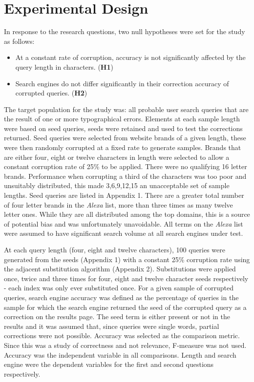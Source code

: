 \documentclass{csfourzero}
\begin{document}
\section{Experimental Design}
\label{sec:exp}

In response to the research questions, two null hypotheses were set for the study as follows:
\begin{itemize}
  \item{At a constant rate of corruption, accuracy is not significantly affected by the query length in characters. (\textbf{H1})}
  \item{Search engines do not differ significantly in their correction accuracy of corrupted queries. (\textbf{H2})}
\end{itemize}

\noindent
The target population for the study was: all probable user search queries that are the result of one or more typographical errors. Elements at each sample length were based on seed queries, seeds were retained and used to test the corrections returned. Seed queries were selected from website brands of a given length, these were then randomly corrupted at a fixed rate to generate samples. Brands that are either four, eight or twelve characters in length were selected to allow a constant corruption rate of 25\% to be applied. There were no qualifying 16 letter brands. Performance when corrupting a third of the characters was too poor and unsuitably distributed, this made 3,6,9,12,15 an unacceptable set of sample lengths. Seed queries are listed in Appendix 1. There are a greater total number of four letter brands in the \textit{Alexa} list, more than three times as many twelve letter ones. While they are all distributed among the top domains, this is a source of potential bias and was unfortunately unavoidable. All terms on the \textit{Alexa} list were assumed to have significant search volume at all search engines under test.

At each query length (four, eight and twelve characters), 100 queries were generated from the seeds (Appendix 1) with a constant 25\% corruption rate using the adjacent substitution algorithm (Appendix 2). Substitutions were applied once, twice and three times for four, eight and twelve character seeds respectively - each index was only ever substituted once. For a given sample of corrupted queries, search engine accuracy was defined as the percentage of queries in the sample for which the search engine returned the seed of the corrupted query as a correction on the results page. The seed term is either present or not in the results and it was assumed that, since queries were single words, partial corrections were not possible. Accuracy was selected as the comparison metric. Since this was a study of correctness and not relevance, F-measure was not used. Accuracy was the independent variable in all comparisons. Length and search engine were the dependent variables for the first and second questions respectively.
\end{document}
